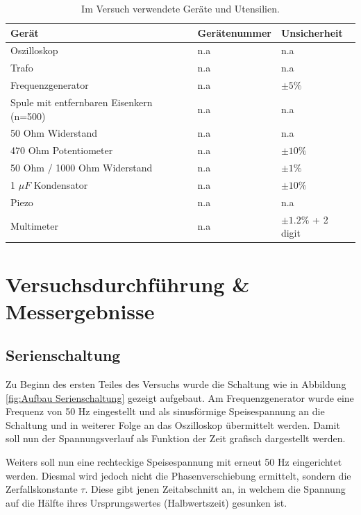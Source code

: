 \documentclass[12pt,a4paper,twoside]{article}
\begin{document}
    \begin{table}[H]
        \centering
        \caption{Im Versuch verwendete Geräte und Utensilien.}
        \label{tab:geraete}
        \begin{tabular}{| l | l | l |}
            \hline
            Gerät & Gerätenummer  & Unsicherheit \\
            \hline
            Oszilloskop         & {n.a} & {n.a} \\
            Trafo               & {n.a} & {n.a} \\
            Frequenzgenerator   & {n.a} & $\pm 5\%$ \\
            Spule mit entfernbaren Eisenkern (n=500) & {n.a} & {n.a} \\
            50 Ohm Widerstand   & {n.a} & {n.a} \\
            470 Ohm Potentiometer & {n.a} & $\pm 10\%$ \\
            50 Ohm / 1000 Ohm Widerstand & {n.a} & $\pm 1\%$ \\
            1 $\mu F$ Kondensator & {n.a} & $\pm 10\%$ \\
            Piezo               & {n.a} & {n.a} \\
            Multimeter          & {n.a} & $\pm 1.2\%$ + 2 digit \\
            \hline
        \end{tabular}
    \end{table}


\section{Versuchsdurchführung \& Messergebnisse} %

\subsection{Serienschaltung}

Zu Beginn des ersten Teiles des Versuchs wurde die Schaltung wie in Abbildung \ref{fig:Aufbau Serienschaltung} gezeigt aufgebaut. 
Am Frequenzgenerator wurde eine Frequenz von 50 Hz eingestellt und als sinusförmige Speisespannung an die Schaltung und in weiterer Folge an das Oszilloskop übermittelt werden. Damit soll nun der Spannungsverlauf als Funktion der Zeit grafisch dargestellt werden. \newline

\noindent
Weiters soll nun eine rechteckige Speisespannung mit erneut 50 Hz eingerichtet werden. Diesmal wird jedoch nicht die Phasenverschiebung ermittelt, sondern die Zerfallskonstante $\tau$.
Diese gibt jenen Zeitabschnitt an, in welchem die Spannung auf die Hälfte ihres Ursprungswertes (Halbwertszeit) gesunken ist. \newline
\end{document}
